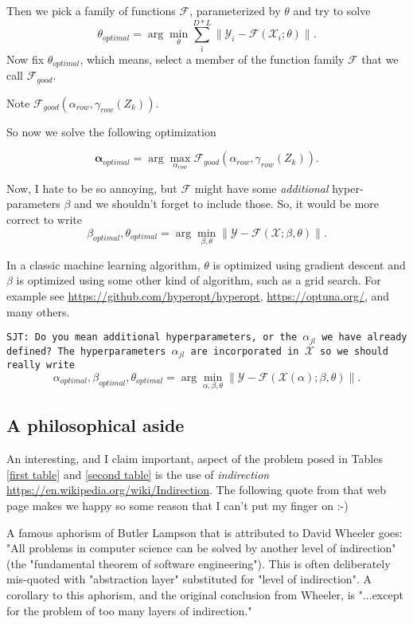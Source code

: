 \documentclass{article}
\begin{document}
Then we pick a family of functions $\mathcal{F}$, parameterized by $\theta$ and try to solve
$$
\theta_{optimal} = \arg \min_{\theta} \sum_i^{D*L} \| \mathcal{Y}_i - \mathcal{F}(\mathcal{X}_i;\theta)\|.
$$
Now fix $\theta_{optimal}$, which means, select a member of the function family $\mathcal{F}$ that we call
$\mathcal{F}_{good}$.

Note $\mathcal{F}_{good}(\alpha_{row},\gamma_{row}(Z_k))$.

So now we solve the following optimization 

$$
\mathbf{\alpha}_{optimal} = \arg \max_{\alpha_{row}}  \mathcal{F}_{good} (\alpha_{row},\gamma_{row}(Z_k) ).
$$



Now, I hate to be so annoying, but $\mathcal{F}$ might have some \emph{additional} hyper-parameters $\beta$ and we shouldn't forget to include those.
So, it would be more correct to write
$$
\beta_{optimal},\theta_{optimal} = \arg \min_{\beta,\theta} \| \mathcal{Y} - \mathcal{F}(\mathcal{X};\beta,\theta)\|.
$$




In a classic machine learning algorithm, $\theta$ is optimized using gradient descent and $\beta$ is optimized using some other kind of algorithm, such as a grid search. For example see \url{https://github.com/hyperopt/hyperopt}, \url{https://optuna.org/}, and many others.

\medskip
{\tt SJT: Do you mean additional hyperparameters, or the $\alpha_{jl}$ we have already defined? The hyperparameters $\alpha_{jl}$ are incorporated in $\mathcal{X}$ so we should really write}
$$
\alpha_{optimal}, \beta_{optimal},\theta_{optimal} = \arg \min_{\alpha,\beta,\theta} \| \mathcal{Y} - \mathcal{F}(\mathcal{X(\alpha)};\beta,\theta)\|.
$$

\medskip


\subsection{A philosophical aside}
An interesting, and I claim important, aspect of the problem posed in Tables \ref{first table} and \ref{second table} is the use of \emph{indirection} \url{https://en.wikipedia.org/wiki/Indirection}. The following quote from that web page makes we happy so some reason that I can't put my finger on :-)

\begin{displayquote}
A famous aphorism of Butler Lampson that is attributed to David Wheeler goes: "All problems in computer science can be solved by another level of indirection" (the "fundamental theorem of software engineering"). This is often deliberately mis-quoted with "abstraction layer" substituted for "level of indirection". A corollary to this aphorism, and the original conclusion from Wheeler, is "...except for the problem of too many layers of indirection."
\end{displayquote}
\end{document}
